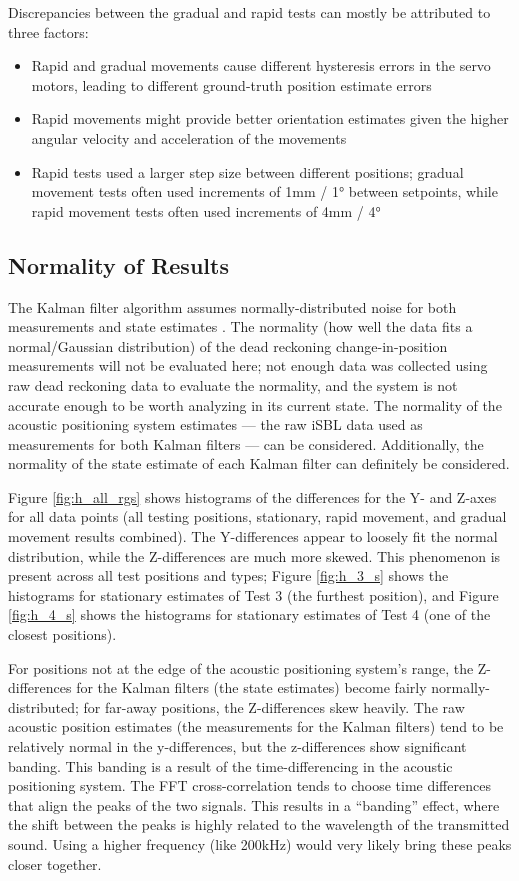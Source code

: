 \documentclass[11pt]{ucthesisCP}
\begin{document}
\pagebreak

Discrepancies between the gradual and rapid tests can mostly be attributed to three factors: 
\begin{itemize}[noitemsep,topsep=0pt,]
	\item Rapid and gradual movements cause different hysteresis errors in the servo motors, leading to different ground-truth position estimate errors
	\item Rapid movements might provide better orientation estimates given the higher angular velocity and acceleration of the movements
	\item Rapid tests used a larger step size between different positions; gradual movement tests often used increments of 1mm / 1° between setpoints, while rapid movement tests often used increments of 4mm / 4°
\end{itemize}

\subsection{Normality of Results} \label{ssec:6s2s5}
The Kalman filter algorithm assumes normally-distributed noise for both measurements and state estimates \cite{kalman}. The normality (how well the data fits a normal/Gaussian distribution) of the dead reckoning change-in-position measurements will not be evaluated here; not enough data was collected using raw dead reckoning data to evaluate the normality, and the system is not accurate enough to be worth analyzing in its current state. The normality of the acoustic positioning system estimates --- the raw iSBL data used as measurements for both Kalman filters --- can be considered. Additionally, the normality of the state estimate of each Kalman filter can definitely be considered.

Figure \ref{fig:h_all_rgs} shows histograms of the differences for the Y- and Z-axes for all data points (all testing positions, stationary, rapid movement, and gradual movement results combined). The Y-differences appear to loosely fit the normal distribution, while the Z-differences are much more skewed. This phenomenon is present across all test positions and types; Figure \ref{fig:h_3_s} shows the histograms for stationary estimates of Test 3 (the furthest position), and Figure \ref{fig:h_4_s} shows the histograms for stationary estimates of Test 4 (one of the closest positions). 

For positions not at the edge of the acoustic positioning system’s range, the Z-differences for the Kalman filters (the state estimates) become fairly normally-distributed; for far-away positions, the Z-differences skew heavily. The raw acoustic position estimates (the measurements for the Kalman filters) tend to be relatively normal in the y-differences, but the z-differences show significant banding. This banding is a result of the time-differencing in the acoustic positioning system. The FFT cross-correlation tends to choose time differences that align the peaks of the two signals. This results in a “banding” effect, where the shift between the peaks is highly related to the wavelength of the transmitted sound. Using a higher frequency (like 200kHz) would very likely bring these peaks closer together.
\end{document}
